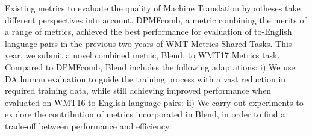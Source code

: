 Existing metrics to evaluate the quality of Machine Translation hypotheses take different perspectives into account. DPMFcomb, a metric combining the merits of a range of metrics, achieved the best performance for evaluation of to-English language pairs in the previous two years of WMT Metrics Shared Tasks. This year, we submit a novel combined metric, Blend, to WMT17 Metrics task. Compared to DPMFcomb, Blend includes the following adaptations: i) We use DA human evaluation to guide the training process with a vast reduction in required training data, while still achieving improved performance when evaluated on WMT16 to-English language pairs; ii) We carry out experiments to explore the contribution of metrics incorporated in Blend, in order to find a trade-off between performance and efficiency.
